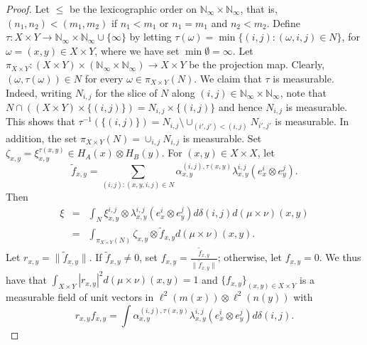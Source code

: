 \documentclass[11pt]{amsart}
\theoremstyle{definition}
\begin{document}
\begin{proof}
  Let $\leq$ be the lexicographic order on $\mathbb N_\infty\times\mathbb N_\infty$, that is, 
  $(n_1,n_2)<(m_1,m_2)$ if $n_1<m_1$ or $n_1=m_1$ and $n_2<m_2$. 
  Define
  $\tau: X\times Y\to \mathbb N_\infty\times\mathbb N_\infty\cup\{\infty\}$ by 
  letting $\tau(\omega)=\min\{(i,j): (\omega,i,j)\in N\}$, for $\omega=(x,y)\in X\times Y$, where we have set 
  $\min\emptyset = \infty$.  Let $\pi_{X\times Y}: (X\times Y)\times (\mathbb N_\infty\times\mathbb N_\infty)\to X\times Y$ be the projection map. Clearly, $(\omega,\tau(\omega))\in N$ for every $\omega\in\pi_{X\times Y}(N)$. 
  We claim that $\tau$ is measurable. 
  Indeed, 
  writing $N_{i,j}$ for the slice of $N$ along $(i,j)\in \mathbb N_\infty\times\mathbb N_\infty$, 
  note that $N\cap ((X\times Y)\times\{(i,j)\})=N_{i,j}\times\{(i,j)\}$ and hence $N_{i,j}$ is measurable. This shows that 
  $\tau^{-1}(\{(i,j)\})=N_{i,j}\setminus\cup_{(i',j')< (i,j)} N_{i',j'}$ is measurable.  
  In addition, the set 
  $\pi_{X\times Y}(N)=\cup_{i,j}N_{i,j}$ is measurable. 
Set $\zeta_{x,y} = \xi_{x,y}^{\tau(x,y)}\in H_A(x)\otimes H_B(y)$. 
For $(x,y)\in X\times X$, let 
$$\tilde{f}_{x,y} = \sum_{(i,j) : (x,y,i,j)\in N} \alpha_{x,y}^{(i,j),\tau(x,y)}\lambda_{x,y}^{i,j}(e_x^i\otimes e_y^j).$$
Then 
\begin{eqnarray*}
  \xi
  & = & 
  \int_N\xi_{x,y}^{i,j}\otimes\lambda_{x,y}^{i,j}(e_x^i\otimes e_y^j)d\delta(i,j)d(\mu\times\nu)(x,y)\\
  & = & 
  \int_{\pi_{X\times Y}(N)} 
\zeta_{x,y}\otimes \tilde{f}_{x,y}
 d(\mu\times\nu)(x,y).
 \end{eqnarray*}  
Let $r_{x,y} = \|\tilde{f}_{x,y}\|$. 
If $\tilde{f}_{x,y}\neq 0$, set 
$f_{x,y} = \frac{\tilde{f}_{x,y}}{\|\tilde{f}_{x,y}\|}$; otherwise, 
let $f_{x,y} = 0$. 
We thus have that 
$\int_{X\times Y}|r_{x,y}|^2 d(\mu\times\nu)(x,y)=1$ and 
  $\{f_{x,y}\}_{(x,y)\in X\times Y}$
  is a measurable field of unit vectors in $\ell^2(m(x))\otimes\ell^2(n(y))$
  with 
  $$r_{x,y}f_{x,y}=\int \alpha_{x,y}^{(i,j),\tau(x,y)}\lambda_{x,y}^{i,j}(e_x^i\otimes e_y^j)d\delta(i,j).$$
  

\end{proof}
\end{document}

